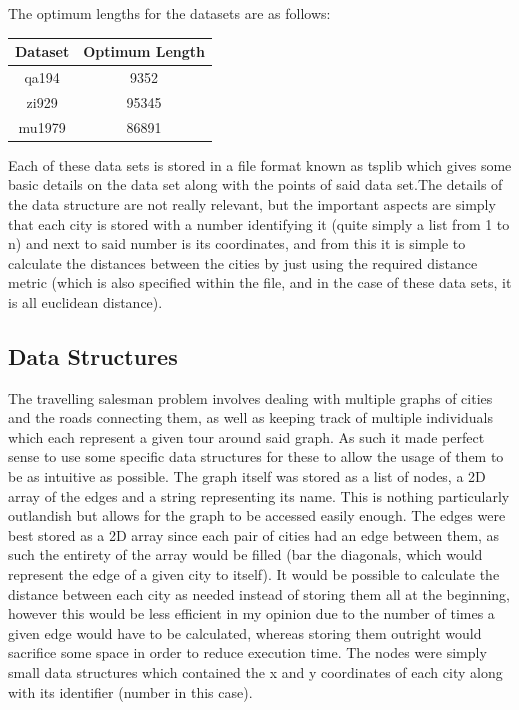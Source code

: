 \documentclass[11pt,a4paper,titlepage]{article}
\begin{document}
The optimum lengths for the datasets are as follows:

\begin{center}
\begin{tabular}{c | c}
Dataset & Optimum Length \\ [0.5ex]
\hline
	qa194 & 9352 \\
	zi929 & 95345 \\
	mu1979 & 86891
\end{tabular}
\end{center}

Each of these data sets is stored in a file format known as tsplib which gives some basic details on the data set along with the points of said data set.The details of the data structure are not really relevant, but the important aspects are simply that each city is stored with a number identifying it (quite simply a list from 1 to n) and next to said number is its coordinates, and from this it is simple to calculate the distances between the cities by just using the required distance metric (which is also specified within the file, and in the case of these data sets, it is all euclidean distance).

\subsection{Data Structures}

The travelling salesman problem involves dealing with multiple graphs of cities and the roads connecting them, as well as keeping track of multiple individuals which each represent a given tour around said graph. As such it made perfect sense to use some specific data structures for these to allow the usage of them to be as intuitive as possible. The graph itself was stored as a list of nodes, a 2D array of the edges and a string representing its name. This is nothing particularly outlandish but allows for the graph to be accessed easily enough. The edges were best stored as a 2D array since each pair of cities had an edge between them, as such the entirety of the array would be filled (bar the diagonals, which would represent the edge of a given city to itself). It would be possible to calculate the distance between each city as needed instead of storing them all at the beginning, however this would be less efficient in my opinion due to the number of times a given edge would have to be calculated, whereas storing them outright would sacrifice some space in order to reduce execution time. The nodes were simply small data structures which contained the x and y coordinates of each city along with its identifier (number in this case).
\end{document}
